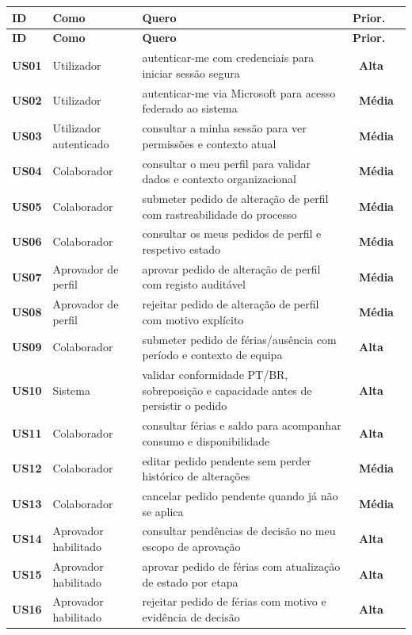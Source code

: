 \documentclass[11pt,a4paper,twoside]{article}
\newcommand{\taghi}  {{\setlength{\fboxsep}{1.5pt}\colorbox{TAGHI}  {\scriptsize\sffamily\bfseries\color{white}~Alta~}}}
\newcommand{\tagmed} {{\setlength{\fboxsep}{1.5pt}\colorbox{TAGMED} {\scriptsize\sffamily\bfseries\color{white}~Média~}}}
\newcommand{\tH}[1]{\textbf{\sffamily\small\color{white}#1}}
\newcommand{\theadrow}{\rowcolor{ACCENT}}
\begin{document}
\begin{longtable}{>{\small\centering\arraybackslash\bfseries}p{1.0cm} >{\small}p{4.4cm} >{\small}p{6.8cm} >{\small\centering\arraybackslash}p{1.4cm}}
\theadrow
\tH{ID} & \tH{Como} & \tH{Quero} & \tH{Prior.} \\
\midrule
\endfirsthead
\theadrow
\tH{ID} & \tH{Como} & \tH{Quero} & \tH{Prior.} \\
\midrule
\endhead
US01 & Utilizador & autenticar-me com credenciais para iniciar sessão segura & \taghi \\
US02 & Utilizador & autenticar-me via Microsoft para acesso federado ao sistema & \tagmed \\
US03 & Utilizador autenticado & consultar a minha sessão para ver permissões e contexto atual & \tagmed \\
US04 & Colaborador & consultar o meu perfil para validar dados e contexto organizacional & \tagmed \\
US05 & Colaborador & submeter pedido de alteração de perfil com rastreabilidade do processo & \tagmed \\
US06 & Colaborador & consultar os meus pedidos de perfil e respetivo estado & \tagmed \\
US07 & Aprovador de perfil & aprovar pedido de alteração de perfil com registo auditável & \tagmed \\
US08 & Aprovador de perfil & rejeitar pedido de alteração de perfil com motivo explícito & \tagmed \\
US09 & Colaborador & submeter pedido de férias/ausência com período e contexto de equipa & \taghi \\
US10 & Sistema & validar conformidade PT/BR, sobreposição e capacidade antes de persistir o pedido & \taghi \\
US11 & Colaborador & consultar férias e saldo para acompanhar consumo e disponibilidade & \taghi \\
US12 & Colaborador & editar pedido pendente sem perder histórico de alterações & \tagmed \\
US13 & Colaborador & cancelar pedido pendente quando já não se aplica & \tagmed \\
US14 & Aprovador habilitado & consultar pendências de decisão no meu escopo de aprovação & \taghi \\
US15 & Aprovador habilitado & aprovar pedido de férias com atualização de estado por etapa & \taghi \\
US16 & Aprovador habilitado & rejeitar pedido de férias com motivo e evidência de decisão & \taghi \\

\end{longtable}
\end{document}
